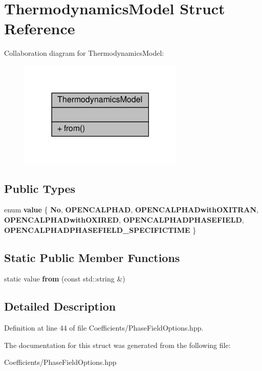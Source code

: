 \hypertarget{structThermodynamicsModel}{}\section{Thermodynamics\+Model Struct Reference}
\label{structThermodynamicsModel}


Collaboration diagram for Thermodynamics\+Model\+:\nopagebreak
\begin{figure}[H]
\begin{center}
\leavevmode
\includegraphics[width=222pt]{structThermodynamicsModel__coll__graph}
\end{center}
\end{figure}
\subsection*{Public Types}
\begin{DoxyCompactItemize}
\item 
\mbox{\label{structThermodynamicsModel_abeb7d4c34261a49d63b13e605a6b6e80}} 
enum {\bfseries value} \{ \newline
{\bfseries No}, 
{\bfseries O\+P\+E\+N\+C\+A\+L\+P\+H\+AD}, 
{\bfseries O\+P\+E\+N\+C\+A\+L\+P\+H\+A\+Dwith\+O\+X\+I\+T\+R\+AN}, 
{\bfseries O\+P\+E\+N\+C\+A\+L\+P\+H\+A\+Dwith\+O\+X\+I\+R\+ED}, 
\newline
{\bfseries O\+P\+E\+N\+C\+A\+L\+P\+H\+A\+D\+P\+H\+A\+S\+E\+F\+I\+E\+LD}, 
{\bfseries O\+P\+E\+N\+C\+A\+L\+P\+H\+A\+D\+P\+H\+A\+S\+E\+F\+I\+E\+L\+D\+\_\+\+S\+P\+E\+C\+I\+F\+I\+C\+T\+I\+ME}
 \}
\end{DoxyCompactItemize}
\subsection*{Static Public Member Functions}
\begin{DoxyCompactItemize}
\item 
\mbox{\label{structThermodynamicsModel_ae1d828744ace0d34c20bc5df046f213d}} 
static value {\bfseries from} (const std\+::string \&)
\end{DoxyCompactItemize}


\subsection{Detailed Description}


Definition at line 44 of file Coefficients/\+Phase\+Field\+Options.\+hpp.



The documentation for this struct was generated from the following file\+:\begin{DoxyCompactItemize}
\item 
Coefficients/\+Phase\+Field\+Options.\+hpp\end{DoxyCompactItemize}
